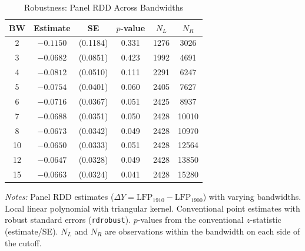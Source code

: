 \begin{table}[htbp]
\centering
\caption{Robustness: Panel RDD Across Bandwidths}
\label{tab:panel_robustness}
\begin{tabular}{cccccc}
\toprule
  BW & Estimate & SE & $p$-value & $N_L$ & $N_R$ \\
\midrule
  2 & $-0.1150$ & (0.1184) & 0.331 & 1276 & 3026 \\
  3 & $-0.0682$ & (0.0851) & 0.423 & 1992 & 4691 \\
  4 & $-0.0812$ & (0.0510) & 0.111 & 2291 & 6247 \\
  5 & $-0.0754$ & (0.0401) & 0.060 & 2405 & 7627 \\
  6 & $-0.0716$ & (0.0367) & 0.051 & 2425 & 8937 \\
  7 & $-0.0688$ & (0.0351) & 0.050 & 2428 & 10010 \\
  8 & $-0.0673$ & (0.0342) & 0.049 & 2428 & 10970 \\
  10 & $-0.0650$ & (0.0333) & 0.051 & 2428 & 12564 \\
  12 & $-0.0647$ & (0.0328) & 0.049 & 2428 & 13850 \\
  15 & $-0.0663$ & (0.0324) & 0.041 & 2428 & 15280 \\
\bottomrule
\end{tabular}
\begin{tablenotes}[flushleft]
\small
\item \textit{Notes:} Panel RDD estimates ($\Delta Y = \text{LFP}_{1910} - \text{LFP}_{1900}$) with varying bandwidths. Local linear polynomial with triangular kernel. Conventional point estimates with robust standard errors (\texttt{rdrobust}). $p$-values from the conventional $z$-statistic (estimate/SE). $N_L$ and $N_R$ are observations within the bandwidth on each side of the cutoff.
\end{tablenotes}
\end{table}
